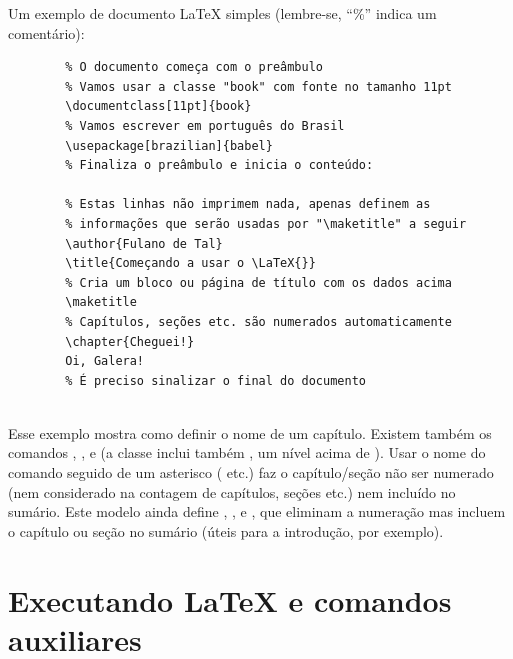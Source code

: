 Um exemplo de documento \LaTeX{} simples (lembre-se, ``\%'' indica um
comentário):

\begin{verbatim}
        % O documento começa com o preâmbulo
        % Vamos usar a classe "book" com fonte no tamanho 11pt
        \documentclass[11pt]{book}
        % Vamos escrever em português do Brasil
        \usepackage[brazilian]{babel}
        % Finaliza o preâmbulo e inicia o conteúdo:
        
        % Estas linhas não imprimem nada, apenas definem as
        % informações que serão usadas por "\maketitle" a seguir
        \author{Fulano de Tal}
        \title{Começando a usar o \LaTeX{}}
        % Cria um bloco ou página de título com os dados acima
        \maketitle
        % Capítulos, seções etc. são numerados automaticamente
        \chapter{Cheguei!}
        Oi, Galera!
        % É preciso sinalizar o final do documento
        
\end{verbatim}

Esse exemplo mostra como definir o nome de um capítulo. Existem também os
comandos , ,  e
 (a classe  inclui também , um nível
acima de ). Usar o nome do comando seguido de um asterisco
( etc.) faz o capítulo/seção não ser numerado (nem
considerado na contagem de capítulos, seções etc.) nem incluído no
sumário. Este modelo ainda define , ,
 e , que eliminam a
numeração mas incluem o capítulo ou seção no sumário (úteis para a
introdução, por exemplo).

\section{Executando \LaTeX{} e comandos auxiliares}
\label{sec:make}

\enlargethispage{.5\baselineskip}

